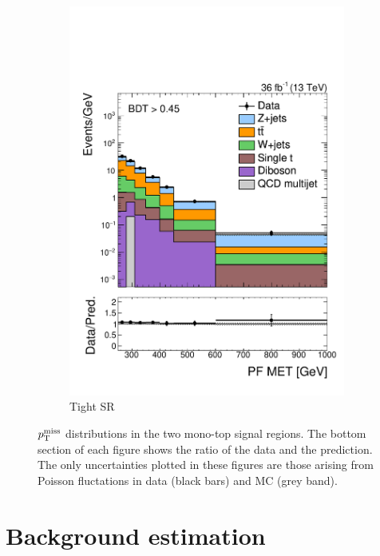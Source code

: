 \begin{figure}[]
\begin{center}
\begin{subfigure}[t]{0.49\textwidth}
            \includegraphics[width=\textwidth]{figures/monotop/prefit/signal_tight_pfmet_logy.pdf}
            \caption{Tight SR}
        \end{subfigure}
        \caption{$p_\mathrm{T}^\mathrm{miss}$ distributions in the two mono-top signal regions.
                 The bottom section of each figure shows the ratio of the data and the prediction.
                 The only uncertainties plotted in these figures are those arising from Poisson fluctations in data (black bars) and MC (grey band).}
        \label{fig:mt:prefit_signal}
    \end{center}
\end{figure}

\clearpage

\section{Background estimation}
\label{sec:mt:bkg}

